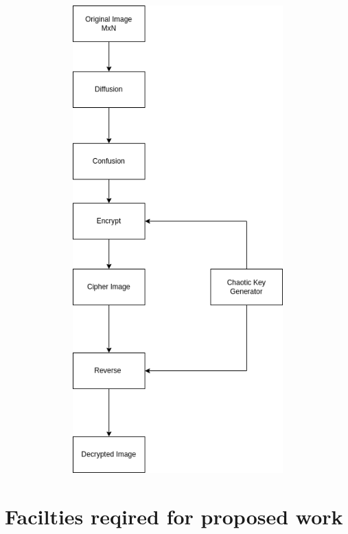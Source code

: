 \documentclass[12pt,a4paper,english]{article}
\begin{document}
\includegraphics[height=18cm,width=15cm]{graph}
\newpage
\section{Facilties reqired for proposed work}
\end{document}
